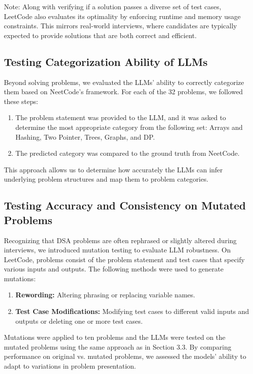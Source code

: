 \documentclass[times, 10pt,twocolumn]{article}
\begin{document}
Note: Along with verifying if a solution passes a diverse set of test cases, LeetCode also evaluates its optimality by enforcing runtime and memory usage constraints. This mirrors real-world interviews, where candidates are typically expected to provide solutions that are both correct and efficient.

\subsection{Testing Categorization Ability of LLMs}
Beyond solving problems, we evaluated the LLMs' ability to correctly categorize them based on NeetCode's framework. For each of the 32 problems, we followed these steps:

\begin{enumerate}
    \item The problem statement was provided to the LLM, and it was asked to determine the most appropriate category from the following set: Arrays and Hashing, Two Pointer, Trees, Graphs, and DP.
    \item The predicted category was compared to the ground truth from NeetCode.
\end{enumerate}

This approach allows us to determine how accurately the LLMs can infer underlying problem structures and map them to problem categories.

\subsection{Testing Accuracy and Consistency on Mutated Problems}

Recognizing that DSA problems are often rephrased or slightly altered during interviews, we introduced mutation testing to evaluate LLM robustness. On LeetCode, problems consist of the problem statement and test cases that specify various inputs and outputs. The following methods were used to generate mutations:
\begin{enumerate}
    \item \textbf{Rewording:} Altering phrasing or replacing variable names.
    \item \textbf{Test Case Modifications:} Modifying test cases to different valid inputs and outputs or deleting one or more test cases.
\end{enumerate}

Mutations were applied to ten problems and the LLMs were tested on the mutated problems using the same approach as in Section 3.3. By comparing performance on original vs. mutated problems, we assessed the models' ability to adapt to variations in problem presentation.
\end{document}
